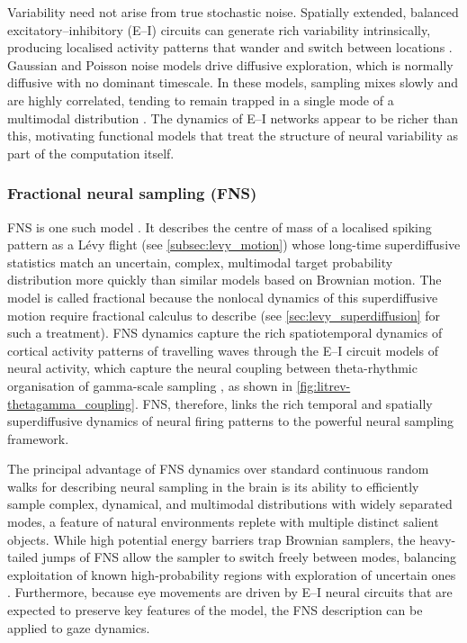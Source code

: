 Variability need not arise from true stochastic noise. Spatially extended, balanced excitatory--inhibitory (E--I) circuits can generate rich variability intrinsically, producing localised activity patterns that wander and switch between locations \cite{chen_spatiotemporal_2022}. Gaussian and Poisson noise models drive diffusive exploration, which is normally diffusive with no dominant timescale. In these models, sampling mixes slowly and are highly correlated, tending to remain trapped in a single mode of a multimodal distribution \cite{neal_sampling_1996, latuszynski_mcmc_2025}. The dynamics of E--I networks appear to be richer than this, motivating functional models that treat the structure of neural variability as part of the computation itself.

\subsubsection*{Fractional neural sampling (FNS)}
FNS is one such model \cite{qi_fractional_2022}. It describes the centre of mass of a localised spiking pattern as a Lévy flight (see \cref{subsec:levy_motion}) whose long-time superdiffusive statistics match an uncertain, complex, multimodal target probability distribution more quickly than similar models based on Brownian motion. The model is called fractional because the nonlocal dynamics of this superdiffusive motion require fractional calculus to describe \cite{tarasov_general_2021} (see \cref{sec:levy_superdiffusion} for such a treatment). FNS dynamics capture the rich spatiotemporal dynamics of cortical activity patterns of travelling waves through the E--I circuit models of neural activity, which capture the neural coupling between theta-rhythmic organisation of gamma-scale sampling \cite{chen_spatiotemporal_2022}, as shown in \cref{fig:litrev-thetagamma_coupling}. FNS, therefore, links the rich temporal and spatially superdiffusive dynamics of neural firing patterns to the powerful neural sampling framework. 

The principal advantage of FNS dynamics over standard continuous random walks for describing neural sampling in the brain is its ability to efficiently sample complex, dynamical, and multimodal distributions with widely separated modes, a feature of natural environments replete with multiple distinct salient objects. While high potential energy barriers trap Brownian samplers, the heavy-tailed jumps of FNS allow the sampler to switch freely between modes, balancing exploitation of known high-probability regions with exploration of uncertain ones \cite{simsekli_fractional_nodate, metzler_random_2000, chen_spatiotemporal_2022}. Furthermore, because eye movements are driven by E--I neural circuits that are expected to preserve key features of the model, the FNS description can be applied to gaze dynamics.
